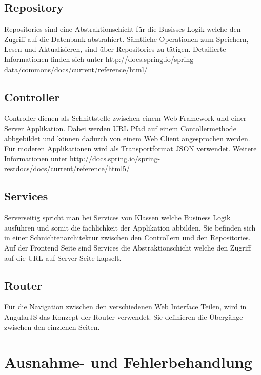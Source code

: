 \subsection{Repository}

Repositories sind eine Abstraktionschicht für die Busisses Logik welche den Zugriff auf die Datenbank abstrahiert. Sämtliche Operationen zum Speichern, Lesen und Aktualisieren, sind über Repositories zu tätigen.  Detailierte Informationen finden sich unter \url{http://docs.spring.io/spring-data/commons/docs/current/reference/html/}

\subsection{Controller}

Controller dienen als Schnittstelle zwischen einem Web Framework und einer Server Applikation. Dabei werden URL Pfad auf einem Contollermethode abbgebildet und können dadurch von einem Web Client angesprochen werden. Für moderen Applikationen wird als Transportformat JSON verwendet. Weitere Informationen unter \url{http://docs.spring.io/spring-restdocs/docs/current/reference/html5/}

\subsection{Services}

Serverseitig spricht man bei Services von Klassen welche Business Logik ausführen und somit die fachlichkeit der Applikation abbilden. Sie befinden sich in einer Schnichtenarchitektur zwischen den Controllern und den Repositories. Auf der Frontend Seite sind Services die Abstraktionschicht welche den Zugriff auf die URL auf Server Seite kapselt.

\subsection{Router}

Für die Navigation zwischen den verschiedenen Web Interface Teilen, wird in AngularJS das Konzept der Router verwendet. Sie definieren die Übergänge zwischen den einzlenen Seiten.

\section{Ausnahme- und Fehlerbehandlung}

